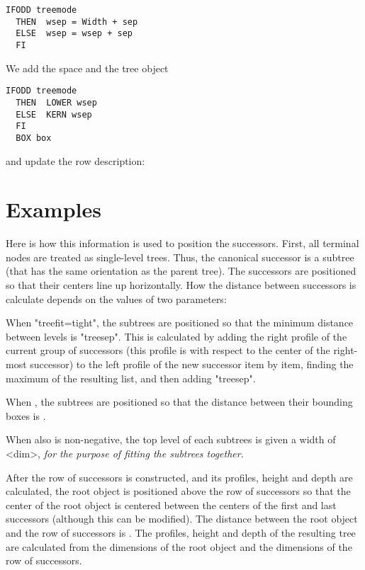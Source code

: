 \documentclass[11pt,english,BCOR10mm,DIV12,bibliography=totoc,parskip=false,smallheadings
    headexclude,footexclude,oneside]{pst-doc}
\begin{document}
\begin{lstlisting}[style=syntax]
  IFODD treemode
  THEN  wsep = Width + sep
  ELSE  wsep = wsep + sep
  FI
\end{lstlisting}

We add the space and the tree object
\begin{lstlisting}[style=syntax]
  IFODD treemode
  THEN  LOWER wsep
  ELSE  KERN wsep
  FI
  BOX box
\end{lstlisting}
and update the row description:

\section{Examples}

Here is how this information is used to position the successors. First, all terminal nodes 
are treated as single-level trees. Thus, the canonical successor is a subtree (that has the 
same orientation as the parent tree). The successors are positioned so that their centers 
line up horizontally. How the distance between successors is calculate depends on the 
values of two parameters:

\begin{compactitem}
 \item When "treefit=tight", the subtrees are positioned so that the minimum distance 
 between levels is "treesep". This is calculated by adding the right profile of the 
 current group of successors (this profile is with respect to the center of the 
 right-most successor) to the left profile of the new successor item by item, finding 
 the maximum of the resulting list, and then adding "treesep".

\item When , the subtrees are positioned so that the distance between their bounding 
boxes is .

\item When also  is non-negative, the top level of each subtrees is given a width of <dim>, 
{\em  for the purpose of fitting the subtrees together}.
\end{compactitem}

After the row of successors is constructed, and its profiles, height and depth are calculated, the root object is 
positioned above the row of successors so that the center of the root object is centered between the centers of 
the first and last successors (although this can be modified). The distance between the root object and the row 
of successors is . The profiles, height and depth of the resulting tree are calculated 
from the dimensions of the root object and the dimensions of the row of successors.
\end{document}
